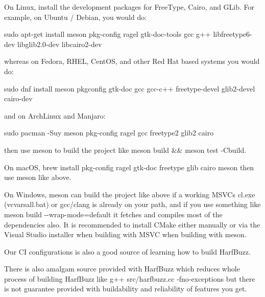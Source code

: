 On Linux, install the development packages for Free\+Type, Cairo, and GLib. For example, on Ubuntu / Debian, you would do\+: \begin{DoxyVerb}sudo apt-get install meson pkg-config ragel gtk-doc-tools gcc g++ libfreetype6-dev libglib2.0-dev libcairo2-dev
\end{DoxyVerb}
 whereas on Fedora, RHEL, Cent\+OS, and other Red Hat based systems you would do\+: \begin{DoxyVerb}sudo dnf install meson pkgconfig gtk-doc gcc gcc-c++ freetype-devel glib2-devel cairo-dev
\end{DoxyVerb}
 and on Arch\+Linux and Manjaro\+: \begin{DoxyVerb}sudo pacman -Suy meson pkg-config ragel gcc freetype2 glib2 cairo
\end{DoxyVerb}
 then use meson to build the project like {\ttfamily meson build \&\& meson test -\/Cbuild}.

On mac\+OS, {\ttfamily brew install pkg-\/config ragel gtk-\/doc freetype glib cairo meson} then use meson like above.

On Windows, meson can build the project like above if a working MSVC\textquotesingle{}s cl.\+exe ({\ttfamily vcvarsall.\+bat}) or gcc/clang is already on your path, and if you use something like {\ttfamily meson build -\/-\/wrap-\/mode=default} it fetches and compiles most of the dependencies also. It is recommended to install CMake either manually or via the Visual Studio installer when building with MSVC when building with meson.

Our CI configurations is also a good source of learning how to build Harf\+Buzz.

There is also amalgam source provided with Harf\+Buzz which reduces whole process of building Harf\+Buzz like {\ttfamily g++ src/harfbuzz.\+cc -\/fno-\/exceptions} but there is not guarantee provided with buildability and reliability of features you get. 